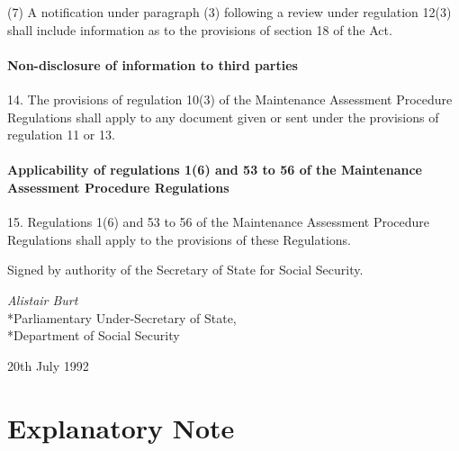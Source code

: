 \documentclass[12pt,a4paper]{article}
\begin{document}
(7) A notification under paragraph (3) following a review under regulation 12(3) shall include information as to the provisions of section 18 of the Act.


\subsection[14. Non-disclosure of information to third parties]{Non-disclosure of information to third parties}

14.  The provisions of regulation 10(3) of the Maintenance Assessment Procedure Regulations shall apply to any document given or sent under the provisions of regulation 11 or 13.

\subsection[15. Applicability of regulations 1(6) and 53 to 56 of the Maintenance Assessment Procedure Regulations]{Applicability of regulations 1(6) and 53 to 56 of the Maintenance Assessment Procedure Regulations}

15.  Regulations 1(6) and 53 to 56 of the Maintenance Assessment Procedure Regulations shall apply to the provisions of these Regulations.

\bigskip

Signed by authority of the Secretary of State for Social Security.

{\raggedleft
\emph{Alistair Burt}\\*Parliamentary Under-Secretary of State,\\*Department of Social Security

}

20th July 1992

\part{Explanatory Note}
\end{document}
